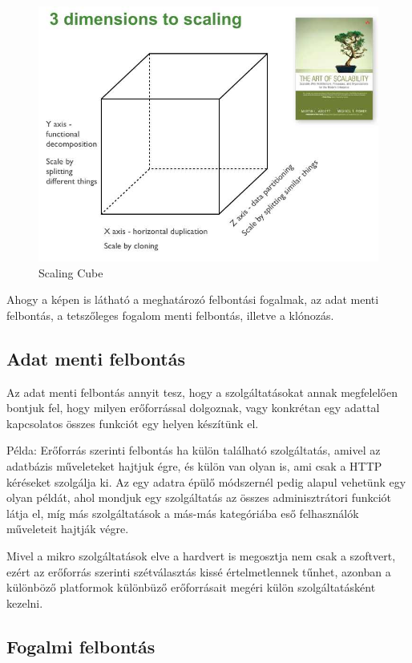 \documentclass[11pt,magyar,a4paper,oneside,]{report}
\let\Oldincludegraphics\includegraphics
\renewcommand{\includegraphics}[1]{
\begin{adjustbox}{max size={\textwidth}{\textheight}}
    \Oldincludegraphics[scale=0.6]{#1}%
\end{adjustbox}
}
\begin{document}
\begin{figure}[htbp]
\centering
\includegraphics{img/ScaleCude.jpg}
\caption{Scaling Cube}
\end{figure}

Ahogy a képen is látható a meghatározó felbontási fogalmak, az adat
menti felbontás, a tetszőleges fogalom menti felbontás, illetve a
klónozás.

\subsection{Adat menti felbontás}\label{adat-menti-felbontuxe1s}

Az adat menti felbontás annyit tesz, hogy a szolgáltatásokat annak
megfelelően bontjuk fel, hogy milyen erőforrással dolgoznak, vagy
konkrétan egy adattal kapcsolatos összes funkciót egy helyen készítünk
el.

Példa: Erőforrás szerinti felbontás ha külön található szolgáltatás,
amivel az adatbázis műveleteket hajtjuk égre, és külön van olyan is, ami
csak a HTTP kéréseket szolgálja ki. Az egy adatra épülő módszernél pedig
alapul vehetünk egy olyan példát, ahol mondjuk egy szolgáltatás az
összes adminisztrátori funkciót látja el, míg más szolgáltatások a
más-más kategóriába eső felhasználók műveleteit hajtják végre.

Mivel a mikro szolgáltatások elve a hardvert is megosztja nem csak a
szoftvert, ezért az erőforrás szerinti szétválasztás kissé
értelmetlennek tűnhet, azonban a különböző platformok különbüző
erőforrásait megéri külön szolgáltatásként kezelni.

\subsection{Fogalmi felbontás}\label{fogalmi-felbontuxe1s}
\end{document}
